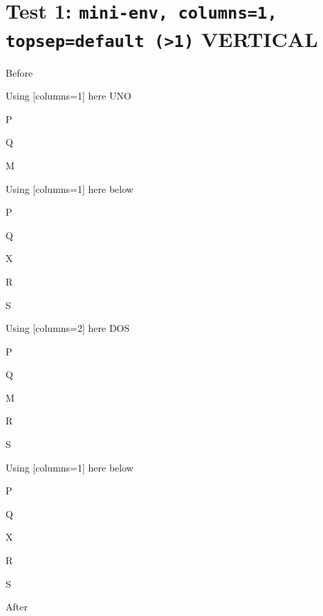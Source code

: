 \documentclass[10pt]{article}
\begin{document}
\section{Test 1: \texttt{mini-env, columns=1, topsep=default (>1)} VERTICAL}

Before
\begin{enumext}[columns=2]

\item Using [columns=1] here UNO

  \begin{enumext}[columns=1]%
     \item  P \item Q \item M%
  \end{enumext}

\item Using [columns=1] here below

\begin{enumext}[columns=1]%
     \item  P \item Q \item X  \item R \item S
  \end{enumext}

\columnbreak

\item Using [columns=2] here DOS

  \begin{enumext}[columns=2]%
    \item  P \item Q \item M \item R \item S
  \end{enumext}

\item Using [columns=1] here below

\begin{enumext}[columns=1]%
     \item  P \item Q \item X  \item R \item S
  \end{enumext}

\end{enumext}
After
\newpage
\end{document}
